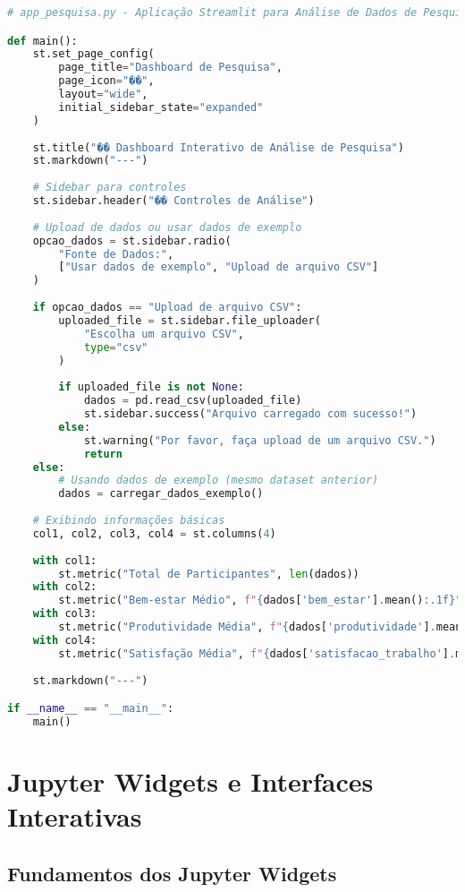 \begin{pythonbox}
\begin{lstlisting}[language=Python]
# app_pesquisa.py - Aplicação Streamlit para Análise de Dados de Pesquisa

def main():
    st.set_page_config(
        page_title="Dashboard de Pesquisa",
        page_icon="��",
        layout="wide",
        initial_sidebar_state="expanded"
    )
    
    st.title("�� Dashboard Interativo de Análise de Pesquisa")
    st.markdown("---")
    
    # Sidebar para controles
    st.sidebar.header("�� Controles de Análise")
    
    # Upload de dados ou usar dados de exemplo
    opcao_dados = st.sidebar.radio(
        "Fonte de Dados:",
        ["Usar dados de exemplo", "Upload de arquivo CSV"]
    )
    
    if opcao_dados == "Upload de arquivo CSV":
        uploaded_file = st.sidebar.file_uploader(
            "Escolha um arquivo CSV",
            type="csv"
        )
        
        if uploaded_file is not None:
            dados = pd.read_csv(uploaded_file)
            st.sidebar.success("Arquivo carregado com sucesso!")
        else:
            st.warning("Por favor, faça upload de um arquivo CSV.")
            return
    else:
        # Usando dados de exemplo (mesmo dataset anterior)
        dados = carregar_dados_exemplo()
    
    # Exibindo informações básicas
    col1, col2, col3, col4 = st.columns(4)
    
    with col1:
        st.metric("Total de Participantes", len(dados))
    with col2:
        st.metric("Bem-estar Médio", f"{dados['bem_estar'].mean():.1f}")
    with col3:
        st.metric("Produtividade Média", f"{dados['produtividade'].mean():.1f}")
    with col4:
        st.metric("Satisfação Média", f"{dados['satisfacao_trabalho'].mean():.1f}")
    
    st.markdown("---")

if __name__ == "__main__":
    main()
\end{lstlisting}
\end{pythonbox}

\section{Jupyter Widgets e Interfaces Interativas}

\subsection{Fundamentos dos Jupyter Widgets}

